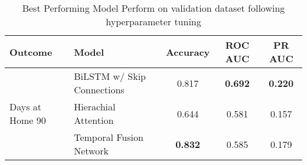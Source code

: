 \documentclass{article}
\begin{document}
\begin{table}[htbp]
    \centering
    \caption{Best Performing Model Perform on validation dataset following hyperparameter tuning}
    \begin{tabular}{llccc}
        \hline
        Outcome                                 & Model                      & Accuracy       & ROC AUC        & PR AUC          \\
        \hline
        \multirow{5}{*}{Days at Home 90}        & BiLSTM w/ Skip Connections & 0.817          & \textbf{0.692} & \textbf{0.220}  \\
                                                & Hierachial Attention       & 0.644          & 0.581          & 0.157           \\
                                                & Temporal Fusion Network    & \textbf{0.832} & 0.585          & 0.179           \\


\end{tabular}
\end{table}
\end{document}
